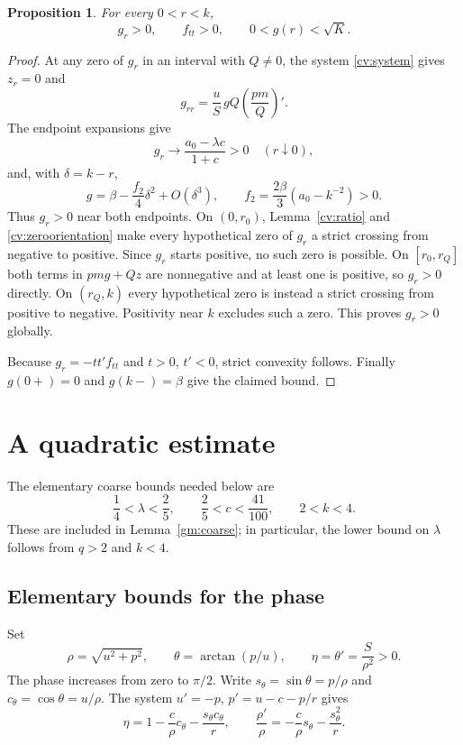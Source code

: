 \documentclass[11pt]{article}
\newtheorem{proposition}[theorem]{Proposition}
\theoremstyle{remark}
\begin{document}
\begin{proposition}
For every $0<r<k$,
\[
 g_r>0,\qquad f_{tt}>0,\qquad 0<g(r)<\sqrt K.
\]
\end{proposition}
\begin{proof}
At any zero of $g_r$ in an interval with $Q\ne0$, the system
\eqref{cv:system} gives $z_r=0$ and
\begin{equation}\label{cv:zeroorientation}
 g_{rr}=\frac{u}{S}\,gQ\left(\frac{pm}{Q}\right)'.
\end{equation}
The endpoint expansions give
\[
 g_r\longrightarrow\frac{a_0-\lambda c}{1+c}>0\quad(r\downarrow0),
\]
and, with $\delta=k-r$,
\[
 g=\beta-\frac{f_2}4\delta^2+O(\delta^3),\qquad
 f_2=\frac{2\beta}{3}(a_0-k^{-2})>0.
\]
Thus $g_r>0$ near both endpoints. On $(0,r_0)$, Lemma~\ref{cv:ratio}
and \eqref{cv:zeroorientation} make every hypothetical zero of $g_r$
a strict crossing from negative to positive. Since $g_r$ starts
positive, no such zero is possible. On $[r_0,r_Q]$ both terms in
$pmg+Qz$ are nonnegative and at least one is positive, so $g_r>0$
directly. On $(r_Q,k)$ every hypothetical zero is instead a strict
crossing from positive to negative. Positivity near $k$ excludes
such a zero. This proves $g_r>0$ globally.

Because $g_r=-t t'f_{tt}$ and $t>0$, $t'<0$, strict convexity
follows. Finally $g(0+)=0$ and $g(k-)=\beta$ give the claimed
bound.
\end{proof}

\section{A quadratic estimate}
The elementary coarse bounds needed below are
\begin{equation}
 \frac14<\lambda<\frac25,\qquad
 \frac25<c<\frac{41}{100},\qquad 2<k<4.
\end{equation}
These are included in Lemma~\ref{gm:coarse}; in particular, the lower
bound on $\lambda$ follows from $q>2$ and $k<4$.

\subsection{Elementary bounds for the phase}
Set
\[
 \rho=\sqrt{u^2+p^2},\qquad \theta=\arctan(p/u),\qquad
 \eta=\theta'=\frac{S}{\rho^2}>0.
\]
The phase increases from zero to $\pi/2$. Write $s_\theta=\sin\theta=p/\rho$
and $c_\theta=\cos\theta=u/\rho$. The system
$u'=-p$, $p'=u-c-p/r$ gives
\begin{equation}\label{ph:phase}
 \eta=1-\frac{c}{\rho} c_\theta-\frac{s_\theta c_\theta}{r},\qquad
 \frac{\rho'}\rho=-\frac{c}{\rho} s_\theta-\frac{s_\theta^2}{r}.
\end{equation}
\end{document}
